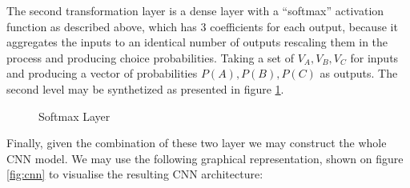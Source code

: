 \documentclass[11pt,]{article}
\begin{document}
The second transformation layer is a dense layer with a ``softmax''
activation function as described above, which has 3 coefficients for
each output, because it aggregates the inputs to an identical number of
outputs rescaling them in the process and producing choice
probabilities. Taking a set of \(V_A, V_B, V_C\) for inputs and
producing a vector of probabilities \(P(A), P(B), P(C)\) as outputs. The
second level may be synthetized as presented in figure \ref{fig:softl}.

\begin{figure}[!htbp] \centering 
 \caption{Softmax Layer} 
 \label{fig:softl} 
\end{figure}

Finally, given the combination of these two layer we may construct the
whole CNN model. We may use the following graphical representation,
shown on figure \ref{fig:cnn} to visualise the resulting CNN
architecture:

\FloatBarrier
\end{document}
